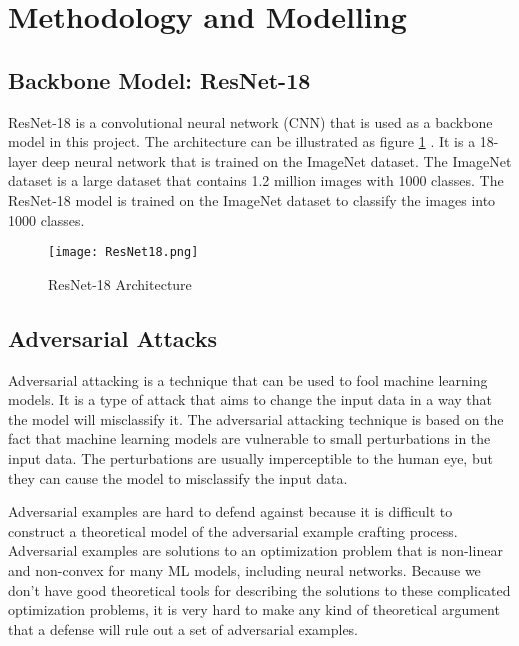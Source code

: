 \section{Methodology and Modelling}

\subsection{Backbone Model: ResNet-18}


ResNet-18 is a convolutional neural network (CNN) that is used as a backbone model in this project. The architecture can be illustrated as figure \ref{fig:resnet18} \cite{ResNet-18}.
It is a 18-layer deep neural network that is trained on the ImageNet dataset. The ImageNet dataset is a large dataset that contains 1.2 million images with 1000 classes. The ResNet-18 model is trained on the ImageNet dataset to classify the images into 1000 classes.


\begin{figure}[h]
\centering
\texttt{[image: ResNet18.png]}
\caption{ResNet-18 Architecture}
\label{fig:resnet18}
\end{figure}

\subsection{Adversarial Attacks}


Adversarial attacking is a technique that can be used to fool machine learning models. It is a type of attack that aims to change the input data in a way that the model will misclassify it. The adversarial attacking technique is based on the fact that machine learning models are vulnerable to small perturbations in the input data. The perturbations are usually imperceptible to the human eye, but they can cause the model to misclassify the input data.

Adversarial examples are hard to defend against because it is difficult to construct a theoretical model of the adversarial example crafting process. Adversarial examples are solutions to an optimization problem that is non-linear and non-convex for many ML models, including neural networks. Because we don't have good theoretical tools for describing the solutions to these complicated optimization problems, it is very hard to make any kind of theoretical argument that a defense will rule out a set of adversarial examples.

